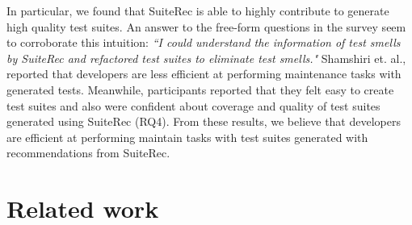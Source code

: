 \documentclass[conference]{IEEEtran}
\begin{document}
In particular, we found that \textsf{SuiteRec} is able to highly contribute to generate high quality test suites. An answer to the free-form questions in the survey seem to corroborate this intuition: {\it ``I could understand the information of test smells by \textsf{SuiteRec} and refactored test suites to eliminate test smells."} Shamshiri et. al.\cite{b1}, reported that developers are less efficient at performing maintenance tasks with generated tests. Meanwhile, participants reported that they felt easy to create test suites and also were confident about coverage and quality of test suites generated using \textsf{SuiteRec} (RQ4). From these results, we believe that developers are efficient at performing maintain tasks with test suites generated with recommendations from \textsf{SuiteRec}.


\section{Related work}
\label{sec:related}
\end{document}
